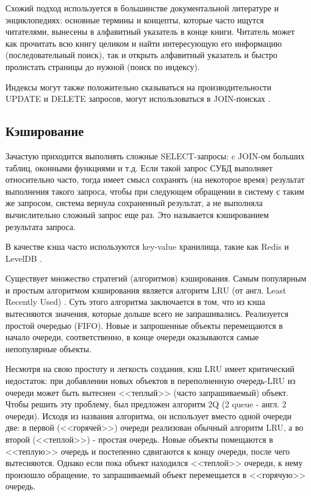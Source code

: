 Схожий подход используется в большинстве документальной литературе и энциклопедиях: основные термины и концепты, которые часто ищутся читателями, вынесены в алфавитный указатель в конце книги. Читатель может как прочитать всю книгу целиком и найти интересующую его информацию (последовательный поиск), так и открыть алфавитный указатель и быстро пролистать страницы до нужной (поиск по индексу).

Индексы могут также положительно сказываться на производительности UPDATE и DELETE запросов, могут использоваться в JOIN-поисках \cite{indexes}. 
 



\subsection{Кэширование}

Зачастую приходится выполнять сложные SELECT-запросы: c JOIN-ом больших таблиц, оконными функциями и т.д. Если такой запрос СУБД выполняет относительно часто, тогда имеет смысл сохранять (на некоторое время) результат выполнения такого запроса, чтобы при следующем обращении в систему с таким же запросом, система вернула сохраненный результат, а не выполняла вычислительно сложный запрос еще раз. Это называется кэшированием результата запроса.

В качестве кэша часто используются key-value хранилища, такие как Redis \cite{redis} и LevelDB \cite{leveldb}.

Существует множество стратегий (алгоритмов) кэширования. Самым популярным и простым алгоритмом кэширования является алгоритм LRU (от англ. Least Recently Used) \cite{lru}. Суть этого алгоритма заключается в том, что из кэша вытесняются значения, которые дольше всего не запрашивались. Реализуется простой очередью (FIFO). Новые и запрошенные объекты перемещаются в начало очереди, соответственно, в конце очереди оказываются самые непопулярные объекты.

Несмотря на свою простоту и легкость создания, кэш LRU имеет критический недостаток: при добавлении новых объектов в переполненную очередь-LRU  из очереди может быть вытеснен <<теплый>> (часто запрашиваемый) объект. Чтобы решить эту проблему, был предложен алгоритм 2Q \cite{2q} (2 queue - англ. 2 очереди). Исходя из названия алгоритма, он использует вместо одной очереди две: в первой (<<горячей>>) очереди реализован обычный алгоритм LRU, а во второй (<<теплой>>) - простая очередь. Новые объекты помещаются в <<теплую>> очередь и постепенно сдвигаются к концу очереди, после чего вытесняются. Однако если пока объект находился <<теплой>> очереди, к нему произошло обращение, то запрашиваемый объект перемещается в <<горячую>> очередь.



